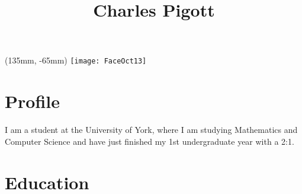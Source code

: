 \documentclass[11pt,a4paper]{article}
\title{Charles Pigott}
\author{}
\date{
  \email{\selfemail}\\
  07821 169 013 (Mobile)\\
  \address
}
\begin{document}
\maketitle
\ifuni
  \begin{textblock*}{40mm}(135mm, -65mm)
  \texttt{[image: FaceOct13]}
  \end{textblock*}
\fi
\thispagestyle{fancy}

\section*{Profile}
I am a student at the University of York, where I am studying Mathematics and
Computer Science and have just finished my 1st undergraduate year with a 2:1.


\section*{Education}
\end{document}
